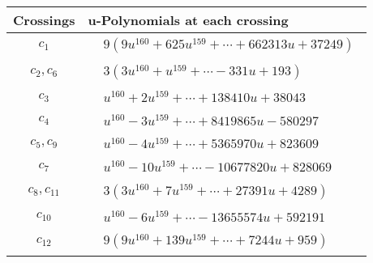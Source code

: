 \documentclass[1p]{elsarticle_modified}
\theoremstyle{definition}
\begin{document}
\begin{tabular}{m{50pt}|m{274pt}}
Crossings & \hspace{64pt}u-Polynomials at each crossing \\
\hline $$\begin{aligned}c_{1}\end{aligned}$$&$\begin{aligned}
&9(9 u^{160}+625 u^{159}+\cdots+662313 u+37249)
\end{aligned}$\\
\hline $$\begin{aligned}c_{2},c_{6}\end{aligned}$$&$\begin{aligned}
&3(3 u^{160}+u^{159}+\cdots-331 u+193)
\end{aligned}$\\
\hline $$\begin{aligned}c_{3}\end{aligned}$$&$\begin{aligned}
&u^{160}+2 u^{159}+\cdots+138410 u+38043
\end{aligned}$\\
\hline $$\begin{aligned}c_{4}\end{aligned}$$&$\begin{aligned}
&u^{160}-3 u^{159}+\cdots+8419865 u-580297
\end{aligned}$\\
\hline $$\begin{aligned}c_{5},c_{9}\end{aligned}$$&$\begin{aligned}
&u^{160}-4 u^{159}+\cdots+5365970 u+823609
\end{aligned}$\\
\hline $$\begin{aligned}c_{7}\end{aligned}$$&$\begin{aligned}
&u^{160}-10 u^{159}+\cdots-10677820 u+828069
\end{aligned}$\\
\hline $$\begin{aligned}c_{8},c_{11}\end{aligned}$$&$\begin{aligned}
&3(3 u^{160}+7 u^{159}+\cdots+27391 u+4289)
\end{aligned}$\\
\hline $$\begin{aligned}c_{10}\end{aligned}$$&$\begin{aligned}
&u^{160}-6 u^{159}+\cdots-13655574 u+592191
\end{aligned}$\\
\hline $$\begin{aligned}c_{12}\end{aligned}$$&$\begin{aligned}
&9(9 u^{160}+139 u^{159}+\cdots+7244 u+959)
\end{aligned}$\\
\hline
\end{tabular}\\~\\
\end{document}
